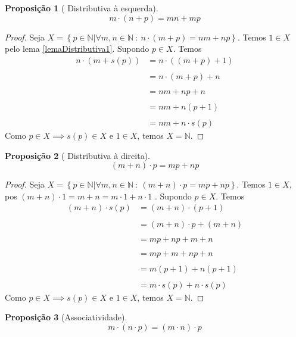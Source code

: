 \documentclass{article}
\theoremstyle{plain}
\newtheorem{prop}{Proposição}
\theoremstyle{definition}
\theoremstyle{remark}
\begin{document}
\begin{prop}[ Distributiva à esquerda]
	$$m\cdot(n+p) = mn +mp$$
\end{prop}
\begin{proof}
	Seja $X = \left\{p \in \mathbb{N} | \forall m,n \in \mathbb{N} \: : \:  n\cdot(m+p) = nm + np\right\}$. Temos $1\in X$ pelo lema \ref{lemaDistributiva1}. Supondo $p\in X$. Temos \begin{align*}
		n\cdot(m+s(p)) &= n\cdot ((m+p)+1)  \\~\\
		&= n\cdot(m+p) + n\\~\\
		&= nm+np+n\\~\\
		&=nm+n(p+1)\\~\\
		&=nm+n\cdot s(p)
	\end{align*}
	Como $p\in X\implies s(p) \in X $ e $1\in X$, temos $X = \mathbb{N}$.
\end{proof}
\begin{prop}[ Distributiva à direita]
	$$(m+n)\cdot p = mp +np$$
\end{prop}
\begin{proof}
	Seja $X = \left\{p \in \mathbb{N} | \forall m,n \in \mathbb{N} \: : \:  (m+n)\cdot p = mp + np\right\}$. Temos $1\in X$, pos $(m+n)\cdot 1 = m+n = m\cdot 1 + n \cdot 1$ . Supondo $p\in X$. Temos \begin{align*}
		(m+n)\cdot s(p) &= (m+n)\cdot(p+1)  \\~\\
		&= (m+n)\cdot p + (m+n)\\~\\
		&= mp+np+m+n\\~\\
		&=mp+m+ np+n\\~\\
		&=m(p+1)+ n(p+1)\\~\\
		&=m\cdot s(p) + n\cdot s(p)
	\end{align*}
	Como $p\in X\implies s(p) \in X $ e $1\in X$, temos $X = \mathbb{N}$.
\end{proof}
\begin{prop}[Associatividade]
	$$m\cdot(n\cdot p) = (m\cdot n ) \cdot p$$
\end{prop}
\end{document}
